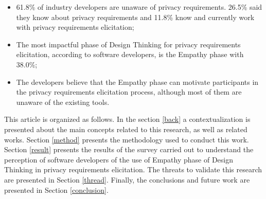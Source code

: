\documentclass[conference]{IEEEtran}
\begin{document}
\begin{itemize}
    \item 61.8\% of industry developers are unaware of privacy requirements. 26.5\% said they know about privacy requirements and 11.8\% know and currently work with privacy requirements elicitation;
    \item  The most impactful phase of Design Thinking for privacy requirements elicitation, according to software developers, is the Empathy phase with 38.0\%;
    \item The developers believe that the Empathy phase can motivate participants in the privacy requirements elicitation process, although most of them are unaware of the existing tools.
\end{itemize}


This article is organized as follows. In the section \ref{back} a contextualization is presented about the main concepts related to this research, as well as related works. Section \ref{method} presents the methodology used to conduct this work. Section \ref{result} presents the results of the survey carried out to understand the perception of software developers of the use of Empathy phase of Design Thinking in privacy requirements elicitation. The threats to validate this research are presented in Section \ref{thread}. Finally, the conclusions and future work are presented in Section \ref{conclusion}.
\end{document}
